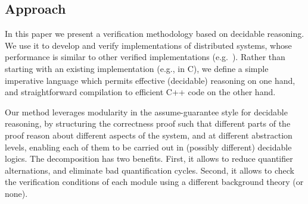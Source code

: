 


\subsection{Approach}
In this paper we present a verification methodology based on decidable
reasoning. We use it to develop and verify implementations of
distributed systems, whose performance is similar to other verified
implementations (e.g.~\cite{VerdiCPP}).
Rather than starting with an existing implementation (e.g., in C), we
define a simple imperative language which permits effective
(decidable) reasoning on one hand, and straightforward compilation
to efficient C++ code on the other hand.

Our method leverages modularity in the assume-guarantee style for decidable reasoning,
by structuring the correctness proof such that different parts of the proof reason about
different aspects of the system, and at different abstraction levels, enabling each of them to
be carried out in (possibly different) decidable logics.
The decomposition has two benefits. First, %
it allows to reduce quantifier alternations, and eliminate bad quantification cycles. Second, it allows to check the verification conditions of each module using a different background theory (or none). %

